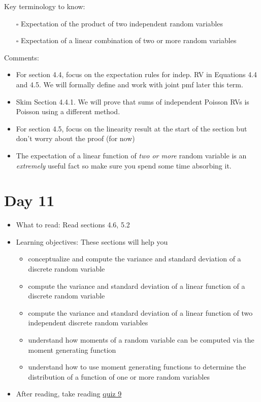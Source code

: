 \documentclass[
  letterpaper,
]{scrbook}
\providecommand{\tightlist}{%
  \setlength{\itemsep}{0pt}\setlength{\parskip}{0pt}}\usepackage{longtable,booktabs,array}
\begin{document}
Key terminology to know:

\begin{itemize}
\tightlist
\item[$\square$]
  Expectation of the product of two independent random variables
\item[$\square$]
  Expectation of a linear combination of two or more random variables
\end{itemize}

Comments:

\begin{itemize}
\tightlist
\item
  For section 4.4, focus on the expectation rules for indep. RV in
  Equations 4.4 and 4.5. We will formally define and work with joint pmf
  later this term.
\item
  Skim Section 4.4.1. We will prove that sums of independent Poisson RVs
  is Poisson using a different method.
\item
  For section 4.5, focus on the linearity result at the start of the
  section but don't worry about the proof (for now)
\item
  The expectation of a linear function of \emph{two or more} random
  variable is an \emph{extremely} useful fact so make sure you spend
  some time absorbing it.
\end{itemize}

\section*{Day 11}\label{day-11}


\begin{itemize}
\item
  What to read: Read sections 4.6, 5.2
\item
  Learning objectives: These sections will help you

  \begin{itemize}
  \tightlist
  \item
    conceptualize and compute the variance and standard deviation of a
    discrete random variable
  \item
    compute the variance and standard deviation of a linear function of
    a discrete random variable
  \item
    compute the variance and standard deviation of a linear function of
    two independent discrete random variables
  \item
    understand how moments of a random variable can be computed via the
    moment generating function
  \item
    understand how to use moment generating functions to determine the
    distribution of a function of one or more random variables
  \end{itemize}
\item
  After reading, take reading
  \href{https://forms.gle/oQ9ZMzGcAznhwoZa6}{quiz 9}
\end{itemize}
\end{document}
